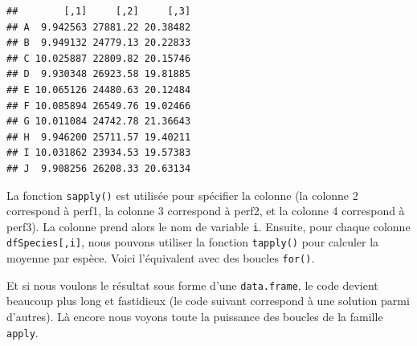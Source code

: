 \documentclass[
]{book}
\newenvironment{Shaded}{\begin{snugshade}}{\end{snugshade}}
\newcommand{\ControlFlowTok}[1]{\textcolor[rgb]{0.13,0.29,0.53}{\textbf{#1}}}
\newcommand{\DecValTok}[1]{\textcolor[rgb]{0.00,0.00,0.81}{#1}}
\newcommand{\KeywordTok}[1]{\textcolor[rgb]{0.13,0.29,0.53}{\textbf{#1}}}
\newcommand{\NormalTok}[1]{#1}
\newcommand{\OperatorTok}[1]{\textcolor[rgb]{0.81,0.36,0.00}{\textbf{#1}}}
\newcommand{\StringTok}[1]{\textcolor[rgb]{0.31,0.60,0.02}{#1}}
\begin{document}
\begin{verbatim}
##        [,1]     [,2]     [,3]
## A  9.942563 27881.22 20.38482
## B  9.949132 24779.13 20.22833
## C 10.025887 22809.82 20.15746
## D  9.930348 26923.58 19.81885
## E 10.065126 24480.63 20.12484
## F 10.085894 26549.76 19.02466
## G 10.011084 24742.78 21.36643
## H  9.946200 25711.57 19.40211
## I 10.031862 23934.53 19.57383
## J  9.908256 26208.33 20.63134
\end{verbatim}

La fonction \texttt{sapply()} est utilisée pour spécifier la colonne (la colonne 2 correspond à perf1, la colonne 3 correspond à perf2, et la colonne 4 correspond à perf3). La colonne prend alors le nom de variable \texttt{i}. Ensuite, pour chaque colonne \texttt{dfSpecies{[},i{]}}, nous pouvons utiliser la fonction \texttt{tapply()} pour calculer la moyenne par espèce. Voici l'équivalent avec des boucles \texttt{for()}.

\begin{Shaded}
\end{Shaded}

Et si nous voulons le résultat sous forme d'une \texttt{data.frame}, le code devient beaucoup plus long et fastidieux (le code suivant correspond à une solution parmi d'autres). Là encore nous voyons toute la puissance des boucles de la famille \texttt{apply}.
\end{document}
